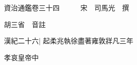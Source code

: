 






























































資治通鑑卷三十四　　　宋　司馬光　撰

胡三省　音註

漢紀二十六|{
	起柔兆執徐盡著雍敦牂凡三年}


孝哀皇帝中

